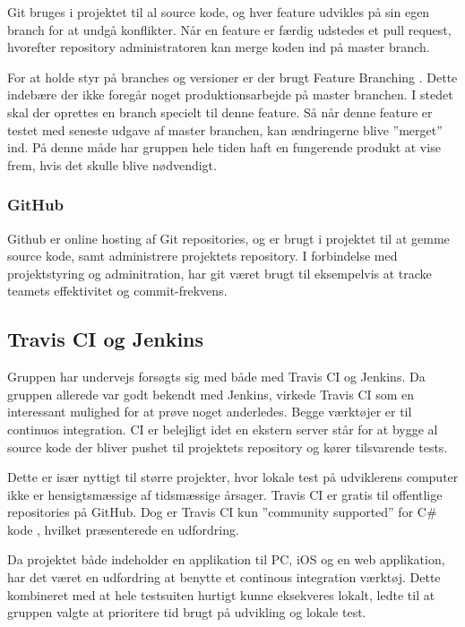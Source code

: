 Git bruges i projektet til al source kode, og hver feature udvikles på sin egen branch for at undgå konflikter. Når en feature er færdig udstedes et pull request, hvorefter repository administratoren kan merge koden ind på master branch.

For at holde styr på branches og versioner er der brugt Feature Branching \cite{atlassian2016}. Dette indebære der ikke foregår noget produktionsarbejde på master branchen. I stedet skal der oprettes en branch specielt til denne feature. Så når denne feature er testet med seneste udgave af master branchen, kan ændringerne blive ''merget'' ind. På denne måde har gruppen hele tiden haft en fungerende produkt at vise frem, hvis det skulle blive nødvendigt.

\subsubsection{GitHub}
Github er online hosting af Git repositories, og er brugt i projektet til at gemme source kode, samt administrere projektets repository. I forbindelse med projektstyring og adminitration, har git været brugt til eksempelvis at tracke teamets effektivitet og commit-frekvens.

\subsection{Travis CI og Jenkins}
Gruppen har undervejs forsøgts sig med både med Travis CI og Jenkins. Da gruppen allerede var godt bekendt med Jenkins, virkede Travis CI som en interessant mulighed for at prøve noget anderledes.
Begge værktøjer er til continuos integration. CI er belejligt idet en ekstern server står for at bygge al source kode der bliver pushet til projektets repository og kører tilsvarende tests.

Dette er især nyttigt til større projekter, hvor lokale test på udviklerens computer ikke er hensigtsmæssige af tidsmæssige årsager. Travis CI er gratis til offentlige repositories på GitHub. Dog er Travis CI kun ''community supported'' for C\# kode \cite{communitysupportedlanguages2016}, hvilket præsenterede en udfordring.

Da projektet både indeholder en applikation til PC, iOS og en web applikation, har det været en udfordring at benytte et continous integration værktøj.
Dette kombineret med at hele testsuiten hurtigt kunne eksekveres lokalt, ledte til at gruppen valgte at prioritere tid brugt på udvikling og lokale test.

